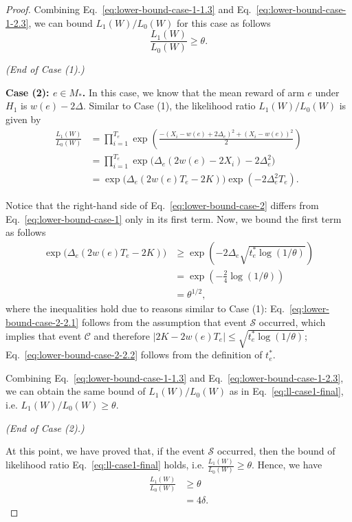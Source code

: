 \documentclass{article}
\begin{document}
\begin{proof}
Combining Eq.~\eqref{eq:lower-bound-case-1-1.3} and Eq.~\eqref{eq:lower-bound-case-1-2.3}, we can bound $L_1(W)/L_0(W)$ for this case as follows
\begin{equation}
\label{eq:ll-case1-final} 
\frac{L_1(W)}{L_0(W)} \ge \theta. 
\end{equation}


\emph{(End of Case (1).)}

\textbf{Case (2): $e\in M_*$.}
In this case, we know that the mean reward of arm $e$ under $H_1$ is $w(e)-2\Delta$.
Similar to Case (1), the likelihood ratio $L_1(W)/L_0(W)$ is given by
\begin{align}
  \frac{L_1(W)}{L_0(W)} &= \prod_{i=1}^{T_e} \exp\left(\frac{-(X_i-w(e)+2\Delta_e)^2+(X_i-w(e))^2}{2}\right) \nonumber \\
  						&= \prod_{i=1}^{T_e} \exp\big(\Delta_e(2w(e)-2X_i)-2\Delta_e^2\big) \nonumber \\
  						&= \exp\big(\Delta_e(2w(e)T_e-2K)\big)\exp(-2\Delta_e^2T_e) \label{eq:lower-bound-case-2}.
\end{align}

Notice that the right-hand side of Eq.~\eqref{eq:lower-bound-case-2} differs from Eq.~\eqref{eq:lower-bound-case-1} only in its first term.
Now, we bound the first term as follows
\begin{align}
	\exp\big(\Delta_e(2w(e)T_e-2K)\big) & \ge \exp\left(-2\Delta_e\sqrt{t_e^*\log(1/\theta)}\right) \label{eq:lower-bound-case-2-2.1}\\
								       & = \exp\left(-\frac{2}{4}\log(1/\theta)\right) \label{eq:lower-bound-case-2-2.2}\\
								       &=\theta^{1/2},  \label{eq:lower-bound-case-2-2.3}
\end{align}
where the inequalities hold due to reasons similar to Case (1): Eq.~\eqref{eq:lower-bound-case-2-2.1} follows from the assumption that event $\mathcal S$ occurred, which implies that event $\mathcal C$ and therefore $|2K-2w(e)T_e| \le \sqrt{t_e^*\log(1/\theta)}$; 
Eq.~\eqref{eq:lower-bound-case-2-2.2} follows from the definition of $t_e^*$.

Combining Eq.~\eqref{eq:lower-bound-case-1-1.3} and Eq.~\eqref{eq:lower-bound-case-1-2.3}, we  can obtain the same bound of $L_1(W)/L_0(W)$ as in Eq.~\eqref{eq:ll-case1-final}, i.e. $L_1(W)/L_0(W) \ge \theta$.

\emph{(End of Case (2).)}

At this point, we have proved that, if the event $\mathcal S$ occurred, then the bound of likelihood ratio Eq.~\eqref{eq:ll-case1-final} holds, i.e. $\frac{L_1(W)}{L_0(W)} \ge \theta$.
Hence, we have
\begin{align}
\frac{L_1(W)}{L_0(W)} &\ge \theta \nonumber \\
					  &= 4\delta.	
\end{align}



\end{proof}
\end{document}
